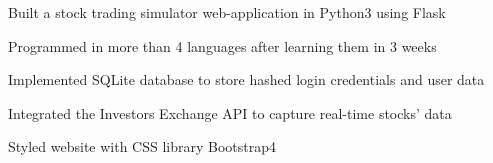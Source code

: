 \documentclass[]{deedy-resume-openfont}
\begin{document}
\begin{minipage}[t]{0.66\textwidth}
    \begin{tightemize}
        \item Built a stock trading simulator web-application in Python3 using Flask
        \item Programmed in more than 4 languages after learning them in 3 weeks
        \item Implemented SQLite database to store hashed login credentials and user data
        \item Integrated the Investors Exchange API to capture real-time stocks' data
        \item Styled website with CSS library Bootstrap4
    \end{tightemize}
    \sectionsep









\end{minipage}
\end{document}
